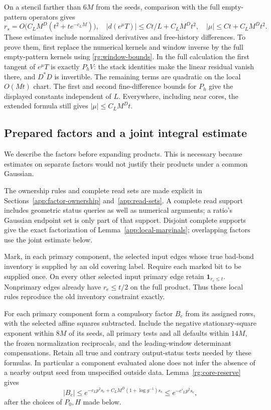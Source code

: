On a stencil farther than $6M$ from the seeds, comparison with the
full empty-pattern operators gives
\begin{equation}
 r_s=O\bigl(C_LM^D(t^2+te^{-c_LM})\bigr),\quad
 |d(e^\mu T)|\le Ct/L+C_LM^Dt^2,\quad
 |\mu|\le Ct+C_LM^Dt^2.
 \label{rg:prediction}
\end{equation}
These estimates include normalized derivatives and free-history
differences.  To prove them, first replace the numerical kernels and
window inverse by the full empty-pattern kernels using
\eqref{rg:window-bounds}.  In the full calculation the first tangent
of $e^\mu T$ is exactly $P_hV$: the stack identities make the linear
residual vanish there, and $D^*D$ is invertible.  The remaining
terms are quadratic on the local $O(Mt)$ chart.  The first and
second fine-difference bounds for $P_h$ give the displayed constants
independent of $L$.  Everywhere, including near cores, the extended
formula still gives $|\mu|\le C_LM^Dt$.

\subsection{Prepared factors and a joint integral estimate}
\label{rg:prepared}

We describe the factors before expanding products.  This is necessary
because estimates on separate factors would not justify their products
under a common Gaussian.

The ownership rules and complete read sets are made explicit in
Sections~\ref{app:factor-ownership} and~\ref{app:read-sets}. A complete
read support includes geometric status queries as well as numerical
arguments; a ratio's Gaussian endpoint set is only part of that support.
Disjoint complete supports give the exact factorization of
Lemma~\ref{app:local-marginals}; overlapping factors use the joint
estimate below.

Mark, in each primary component, the selected input edges whose true
bad-bond inventory is supplied by an old covering label.  Require each
marked bit to be supplied once.  On every other selected input primary
edge retain $\mathbf1_{r_e\le t}$.  Nonprimary edges already have
$r_e\le t/2$ on the full product.  Thus these local rules reproduce
the old inventory constraint exactly.

For each primary component form a compulsory factor $B_c$ from its
assigned rows, with the selected affine squares subtracted.  Include
the negative stationary-square exponent within $8M$ of its seeds,
all primary tests and all defaults within $14M$, the frozen
normalization reciprocals, and the leading-window determinant
compensations.  Retain all true and contrary output-status tests
needed by these formulas.  In particular a component evaluated alone
does not infer the absence of a nearby output seed from unspecified
outside data.  Lemma~\ref{rg:core-reserve} gives
\begin{equation}
 |B_c|\le
 e^{-c_Lp^2s_c+C_LM^D(1+\log g^{-1})s_c}
                    \le e^{-c'_Lp^2s_c},
 \label{rg:core-bound}
\end{equation}
after the choices of $P_0,H$ made below.

